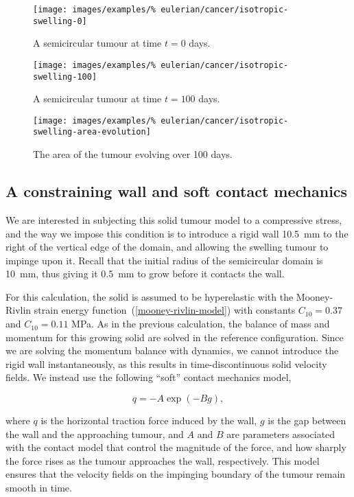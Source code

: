 \begin{figure}[!hptb]
  \centering
  \texttt{[image: images/examples/\%
    eulerian/cancer/isotropic-swelling-0]}
  \caption{A semicircular tumour at time $t=0$ days.}
  \label{tumour-isotropic-swelling-0}
\end{figure}

\begin{figure}[!hptb]
  \centering
  \texttt{[image: images/examples/\%
    eulerian/cancer/isotropic-swelling-100]}
  \caption{A semicircular tumour at time $t=100$ days.}
  \label{tumour-isotropic-swelling-100}
\end{figure}

\begin{figure}[!hptb]
  \centering
  \texttt{[image: images/examples/\%
    eulerian/cancer/isotropic-swelling-area-evolution]}
  \caption{The area of the tumour evolving over 100 days.}
  \label{tumour-isotropic-area-evolution}
\end{figure}

\subsection{A constraining wall and soft contact mechanics}
\label{wall-constraint}

We are interested in subjecting this solid tumour model to a
compressive stress, and the way we impose this condition is to
introduce a rigid wall 10.5~mm to the right of the vertical edge of
the domain, and allowing the swelling tumour to impinge upon
it. Recall that the initial radius of the semicircular domain is
10~mm, thus giving it 0.5~mm to grow before it contacts the wall.

For this calculation, the solid is assumed to be hyperelastic with the
Mooney-Rivlin strain energy function~(\ref{mooney-rivlin-model}) with
constants $C_{10}=0.37$ and $C_{10}=0.11$ MPa. As in the previous
calculation, the balance of mass and momentum for this growing solid
are solved in the reference configuration. Since we are solving the
momentum balance with dynamics, we cannot introduce the rigid wall
instantaneously, as this results in time-discontinuous solid velocity
fields. We instead use the following ``soft'' contact mechanics model,

\begin{equation}
q = - A \exp (-B g),
\end{equation}

\noindent where $q$ is the horizontal traction force induced by the
wall, $g$ is the gap between the wall and the approaching tumour, and
$A$ and $B$ are parameters associated with the contact model that
control the magnitude of the force, and how sharply the force rises as
the tumour approaches the wall, respectively. This model ensures that
the velocity fields on the impinging boundary of the tumour remain
smooth in time.

